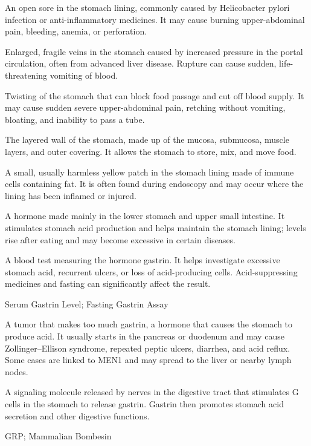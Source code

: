  An open sore in the stomach lining, commonly caused by Helicobacter pylori infection or anti-inflammatory medicines. It may cause burning upper-abdominal pain, bleeding, anemia, or perforation.

 Enlarged, fragile veins in the stomach caused by increased pressure in the portal circulation, often from advanced liver disease. Rupture can cause sudden, life-threatening vomiting of blood.

 Twisting of the stomach that can block food passage and cut off blood supply. It may cause sudden severe upper-abdominal pain, retching without vomiting, bloating, and inability to pass a tube.

 The layered wall of the stomach, made up of the mucosa, submucosa, muscle layers, and outer covering. It allows the stomach to store, mix, and move food.

 A small, usually harmless yellow patch in the stomach lining made of immune cells containing fat. It is often found during endoscopy and may occur where the lining has been inflamed or injured.

 A hormone made mainly in the lower stomach and upper small intestine. It stimulates stomach acid production and helps maintain the stomach lining; levels rise after eating and may become excessive in certain diseases.

 A blood test measuring the hormone gastrin. It helps investigate excessive stomach acid, recurrent ulcers, or loss of acid-producing cells. Acid-suppressing medicines and fasting can significantly affect the result.

\synonyms
Serum Gastrin Level; Fasting Gastrin Assay

 A tumor that makes too much gastrin, a hormone that causes the stomach to produce acid. It usually starts in the pancreas or duodenum and may cause Zollinger--Ellison syndrome, repeated peptic ulcers, diarrhea, and acid reflux. Some cases are linked to MEN1 and may spread to the liver or nearby lymph nodes.

 A signaling molecule released by nerves in the digestive tract that stimulates G cells in the stomach to release gastrin. Gastrin then promotes stomach acid secretion and other digestive functions.

\synonyms
GRP; Mammalian Bombesin

